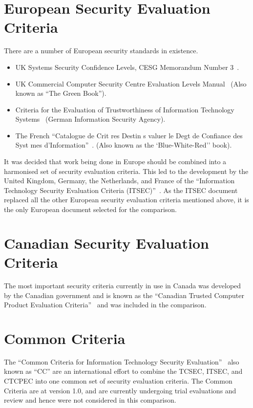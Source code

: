     \section{European Security Evaluation Criteria}
        There are a number of European security standards in existence.
        \begin{itemize}
            \item UK Systems Security Confidence Levels, CESG Memorandum Number 3~\cite{cesg}.
            \item UK Commercial Computer Security Centre Evaluation Levels Manual~\cite{dtiec} 
                  (Also known as ``The Green Book'').
            \item Criteria for the Evaluation of Trustworthiness of Information Technology Systems~\cite{german} 
                  (German Information Security Agency).
            \item The French ``Catalogue de Crit res Destin s valuer le Degt de Confiance des
                  Syst mes d'Information''~\cite{french}.
                  (Also known as the `Blue-White-Red'' book).
        \end{itemize}

        It was decided that work being done in Europe should be combined
        into a harmonised set of security evaluation criteria. This led
        to the development by the United Kingdom, Germany, the
        Netherlands, and France of the ``Information Technology Security
        Evaluation Criteria (ITSEC)''~\cite{itsec}. As the ITSEC document replaced
        all the other European security evaluation criteria mentioned
        above, it is the only European document selected for the comparison.

    \section{Canadian Security Evaluation Criteria}
        The most important security criteria currently in use in Canada
        was developed by the Canadian government and is known as the 
        ``Canadian Trusted Computer Product Evaluation
        Criteria''~\cite{ctcpec}  and
        was included in the comparison.

    \section{Common Criteria}
        The ``Common Criteria for Information Technology Security
        Evaluation''~\cite{cc} also known as ``CC'' are an international effort to combine
        the TCSEC, ITSEC, and CTCPEC into one common set of security
        evaluation criteria. The Common Criteria are at version 1.0, and
        are currently undergoing trial evaluations and review and hence
        were not considered in this comparison.


